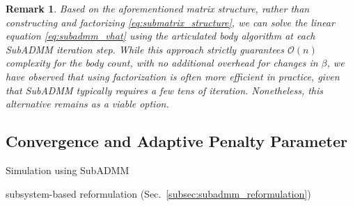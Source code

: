 \documentclass[lettersize,journal]{IEEEtran}
\newtheorem{remark}{Remark}
\begin{document}
\begin{remark}
Based on the aforementioned matrix structure, rather than constructing and factorizing \eqref{eq:submatrix_structure}, we can solve the linear equation \eqref{eq:subadmm_vhat} using the articulated body algorithm \cite{featherstone2014rigid} at each SubADMM iteration step. 
While this approach strictly guarantees $\mathcal{O}(n)$ complexity for the body count, with no additional overhead for changes in $\beta$, we have observed that using factorization is often more efficient in practice, given that SubADMM typically requires a few tens of iteration. Nonetheless, this alternative remains as a viable option.
\end{remark}


\subsection{Convergence and Adaptive Penalty Parameter}

\begin{algorithm} [t]
\SetAlgoLined
\caption{Simulation using SubADMM} 
\label{alg:subadmm}
subsystem-based reformulation (Sec.~\ref{subsec:subadmm_reformulation}) \\
\end{algorithm}
\end{document}

